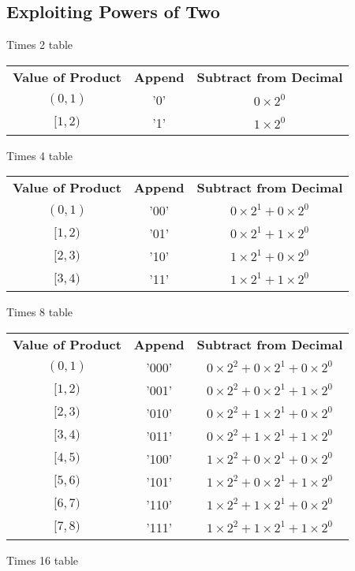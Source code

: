 \documentclass[12pt]{article}
\begin{document}
\subsection{Exploiting Powers of Two}
Times 2 table
\begin{center}
\begin{tabular}{c|c|c}
    \textbf{Value of Product} & \textbf{Append} & \textbf{Subtract from Decimal} \\
    $(0,1)$   & '0' & $0\times2^0$ \\
    $[1,2)$   & '1' & $1\times2^0$
\end{tabular}
\end{center}
Times 4 table
\begin{center}
\begin{tabular}{c|c|c}
    \textbf{Value of Product} & \textbf{Append} & \textbf{Subtract from Decimal} \\
    $(0,1)$   & '00' & $0\times2^1 + 0\times2^0$ \\
    $[1,2)$   & '01' & $0\times2^1 + 1\times2^0$ \\
    $[2,3)$   & '10' & $1\times2^1 + 0\times2^0$ \\
    $[3,4)$   & '11' & $1\times2^1 + 1\times2^0$
\end{tabular}
\end{center}
Times 8 table
\begin{center}
\begin{tabular}{c|c|c}
    \textbf{Value of Product} & \textbf{Append} & \textbf{Subtract from Decimal} \\
    $(0,1)$   & '000' & $0\times2^2 + 0\times2^1 + 0\times2^0$ \\
    $[1,2)$   & '001' & $0\times2^2 + 0\times2^1 + 1\times2^0$ \\
    $[2,3)$   & '010' & $0\times2^2 + 1\times2^1 + 0\times2^0$ \\
    $[3,4)$   & '011' & $0\times2^2 + 1\times2^1 + 1\times2^0$ \\
    $[4,5)$   & '100' & $1\times2^2 + 0\times2^1 + 0\times2^0$ \\
    $[5,6)$   & '101' & $1\times2^2 + 0\times2^1 + 1\times2^0$ \\
    $[6,7)$   & '110' & $1\times2^2 + 1\times2^1 + 0\times2^0$ \\
    $[7,8)$   & '111' & $1\times2^2 + 1\times2^1 + 1\times2^0$
\end{tabular}
\end{center}
Times 16 table
\end{document}
